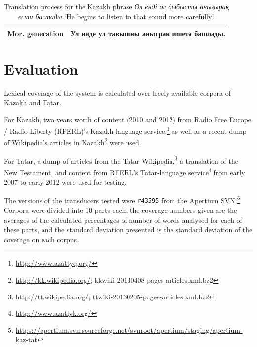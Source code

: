 \documentclass[a4paper,11pt]{article}
\newcommand{\tag}[1]{{\small{\texttt{#1}}}}
\newcommand{\eng}[1]{`#1'}
\begin{document}
\begin{table}[htbp]
\begin{tabular}{ll}
\midrule
{\bf Mor. generation} & Ул инде ул тавышны аныграк ишетә башлады. \\
\bottomrule
\end{tabular}
 \caption{Translation process for the Kazakh phrase \emph{Ол енді ол дыбысты анығырақ ести бастады} \eng{He begins to listen to that sound more carefully}.}
 \label{tab:pipeline}
\end{table}

\section{Evaluation}
\label{sec:eval}

Lexical coverage of the system is calculated over freely available corpora of Kazakh and Tatar.

For Kazakh, two years worth of content (2010 and 2012) from Radio Free Europe / Radio Liberty (RFERL)'s Kazakh-language service,\footnote{\url{http://www.azattyq.org/}} as well as a recent dump of Wikipedia's articles in Kazakh\footnote{\url{http://kk.wikipedia.org/}; {\smallertt kkwiki-20130408-pages-articles.xml.bz2}} were used.

For Tatar, a dump of articles from the Tatar Wikipedia,\footnote{\url{http://tt.wikipedia.org/}; {\smallertt ttwiki-20130205-pages-articles.xml.bz2}} a translation of the New Testament, and content from RFERL's Tatar-language service\footnote{\url{http://www.azatlyk.org/}} from early 2007 to early 2012 were used for testing.

The versions of the transducers tested were {\tt {\small r43595}} from the Apertium SVN.\footnote{\url{https://apertium.svn.sourceforge.net/svnroot/apertium/staging/apertium-kaz-tat}}  Corpora were divided into 10 parts each; the coverage numbers given are the averages of the calculated percentages of number of words analysed for each of these parts, and the standard deviation presented is the standard deviation of the coverage on each corpus.
\end{document}
